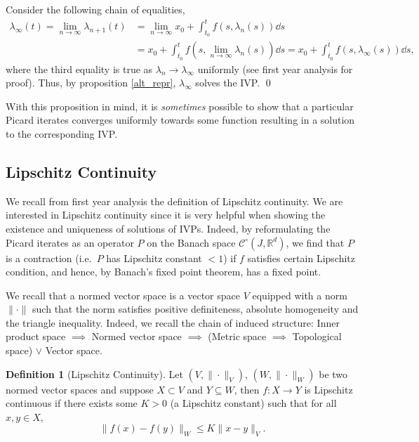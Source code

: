 \documentclass[
]{article}
\theoremstyle{definition}
\theoremstyle{definition}
\newtheorem{definition}{Definition}[section]
\begin{document}
Consider the following chain of equalities, \[\begin{split}
    \lambda_\infty(t) = \lim_{n \to \infty} \lambda_{n + 1}(t) & = 
    \lim_{n \to \infty} x_0 + \int_{t_0}^t f(s, \lambda_n(s)) \dd s\\ &= 
    x_0 + \int_{t_0}^t f(s, \lim_{n \to \infty} \lambda_n(s)) \dd s = 
    x_0 + \int_{t_0}^t f(s, \lambda_\infty(s)) \dd s,
  \end{split}\] where the third equality is true as
\(\lambda_n \to \lambda_\infty\) uniformly (see first year analysis for
proof). Thus, by proposition \ref{alt_repr}, \(\lambda_\infty\) solves
the IVP. \qed

With this proposition in mind, it is \emph{sometimes} possible to show
that a particular Picard iterates converges uniformly towards some
function resulting in a solution to the corresponding IVP.

\hypertarget{lipschitz-continuity}{%
\subsection{Lipschitz Continuity}\label{lipschitz-continuity}}

We recall from first year analysis the definition of Lipschitz
continuity. We are interested in Lipschitz continuity since it is very
helpful when showing the existence and uniqueness of solutions of IVPs.
Indeed, by reformulating the Picard iterates as an operator \(P\) on the
Banach space \(\mathcal{C}^\circ(J, \mathbb{R}^d)\), we find that \(P\)
is a contraction (i.e.~\(P\) has Lipschitz constant \(< 1\)) if \(f\)
satisfies certain Lipschitz condition, and hence, by Banach's fixed
point theorem, has a fixed point.

We recall that a normed vector space is a vector space \(V\) equipped
with a norm \(\| \cdot \|\) such that the norm satisfies positive
definiteness, absolute homogeneity and the triangle inequality. Indeed,
we recall the chain of induced structure: Inner product space
\(\implies\) Normed vector space \(\implies\) (Metric space \(\implies\)
Topological space) \(\vee\) Vector space.

\begin{definition}[Lipschitz Continuity]
  Let \((V, \| \cdot \|_V)\), \((W, \| \cdot \|_W)\) be two normed vector spaces 
  and suppose \(X \subset V\) and \(Y \subseteq W\), then \(f : X \to Y\) is 
  Lipschitz continuous if there exists some \(K > 0\) (a Lipschitz constant) 
  such that for all \(x, y \in X\),
  \[\| f(x) - f(y) \|_W \le K \|x - y\|_V.\]
\end{definition}
\end{document}
